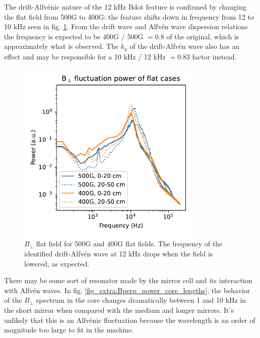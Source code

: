 The drift-Alfv\'enic nature of the 12 kHz Bdot feature is confirmed by changing the flat field from 500G to 400G: the feature shifts down in frequency from 12 to 10 kHz seen in fig. \ref{fig_extra:bperp_500G-vs-400G}. From the drift wave and Alfv\'en wave dispersion relations the frequency is expected to be 400G / 500G $= 0.8$ of the original, which is approximately what is observed. The $k_y$ of the drift-Alfv\'en wave also has an effect and may be responsible for a 10 kHz / 12 kHz $= 0.83$ factor instead. 
\begin{figure}
    \centering
    \includegraphics[width=250pt]{figures/extra/Bperp_fluct_power_M=1_400G_500G.pdf}
    \caption[$B_\perp$, flat field 500G vs 400G]{$B_\perp$ flat field for 500G and 400G flat fields. The frequency of the identified drift-Alfv\'en wave at 12 kHz drops when the field is lowered, as expected.}
    \label{fig_extra:bperp_500G-vs-400G}
\end{figure}

There may be some sort of resonator made by the mirror cell and its interaction with Alfv\'en waves. In fig. \ref{fig_extra:Bperp_power_core_lengths}, the behavior of the $B_\perp$ spectrum in the core changes dramatically between 1 and 10 kHz in the short mirror when compared with the medium and longer mirrors. It's unlikely that this is an Alfv\'enic fluctuation because the wavelength is an order of magnitude too large to fit in the machine. 

